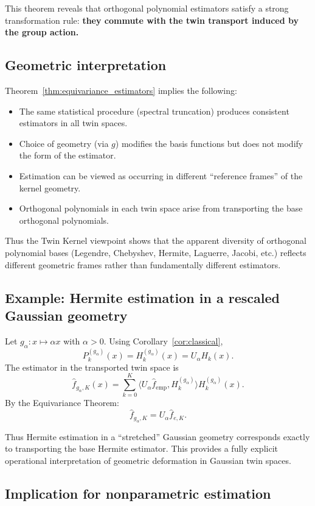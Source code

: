 \documentclass[11pt,a4paper]{article}
\newcommand{\ip}[2]{\langle #1, #2 \rangle}
\begin{document}
This theorem reveals that orthogonal polynomial estimators satisfy a strong transformation rule: \textbf{they commute with the twin transport induced by the group action.}

\subsection{Geometric interpretation}

Theorem~\ref{thm:equivariance_estimators} implies the following:
\begin{itemize}
\item The same statistical procedure (spectral truncation) produces consistent estimators in all twin spaces.
\item Choice of geometry (via $g$) modifies the basis functions but does not modify the form of the estimator.
\item Estimation can be viewed as occurring in different ``reference frames'' of the kernel geometry.
\item Orthogonal polynomials in each twin space arise from transporting the base orthogonal polynomials.
\end{itemize}

Thus the Twin Kernel viewpoint shows that the apparent diversity of orthogonal polynomial bases (Legendre, Chebyshev, Hermite, Laguerre, Jacobi, etc.) reflects different geometric frames rather than fundamentally different estimators.

\subsection{Example: Hermite estimation in a rescaled Gaussian geometry}

Let $g_\alpha : x \mapsto \alpha x$ with $\alpha > 0$. Using Corollary~\ref{cor:classical},
\[
P_k^{(g_\alpha)}(x) = H_k^{(g_\alpha)}(x) = U_\alpha H_k(x).
\]
The estimator in the transported twin space is
\[
\hat{f}_{g_\alpha, K}(x) = \sum_{k=0}^{K} \ip{U_\alpha \hat{f}_{\mathrm{emp}}}{H_k^{(g_\alpha)}} H_k^{(g_\alpha)}(x).
\]
By the Equivariance Theorem:
\[
\hat{f}_{g_\alpha, K} = U_\alpha \hat{f}_{e,K}.
\]

Thus Hermite estimation in a ``stretched'' Gaussian geometry corresponds exactly to transporting the base Hermite estimator. This provides a fully explicit operational interpretation of geometric deformation in Gaussian twin spaces.

\subsection{Implication for nonparametric estimation}
\end{document}

